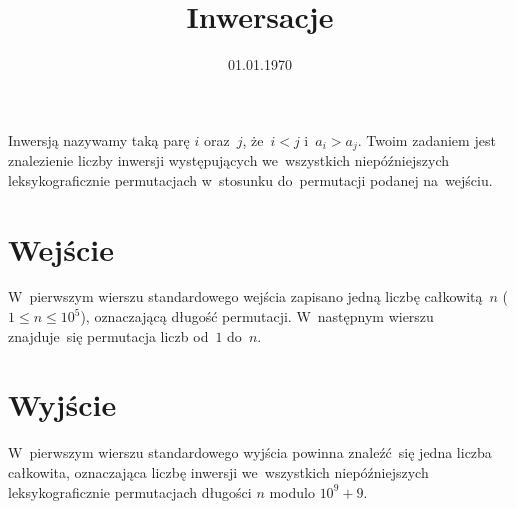 \documentclass[zad]{soigstyl}
\date{01.01.1970}
\title{\mbox{Inwersacje}}
\begin{document}
\begin{tasktext}%
    \noindent
     Inwersją nazywamy taką parę $i$ oraz~$j$, że~$i < j$ i~$a_i > a_j$. Twoim zadaniem jest znalezienie liczby inwersji występujących we~wszystkich niepóźniejszych leksykograficznie permutacjach w~stosunku do~permutacji podanej na~wejściu.
	
    	\section{Wejście}
	W~pierwszym wierszu standardowego wejścia zapisano jedną liczbę całkowitą~$n$ ($1\leqslant n \leqslant 10^5$), oznaczającą długość permutacji. W~następnym wierszu znajduje~się permutacja liczb od~$1$ do~$n$. 

	\section{Wyjście}
	W~pierwszym wierszu standardowego wyjścia powinna znaleźć~się jedna liczba całkowita, oznaczająca liczbę inwersji we~wszystkich niepóźniejszych leksykograficznie permutacjach długości $n$ modulo $10^9 + 9$.
	
	\oigprzyklady
\end{tasktext}
\end{document}
